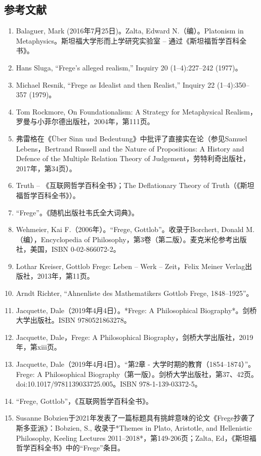 \subsection{参考文献}  
\begin{enumerate}
\item Balaguer, Mark (2016年7月25日)。Zalta, Edward N.（编）。Platonism in Metaphysics。斯坦福大学形而上学研究实验室 – 通过《斯坦福哲学百科全书》。  
\item Hans Sluga, “Frege's alleged realism,” Inquiry 20 (1–4):227–242 (1977)。  
\item Michael Resnik, “Frege as Idealist and then Realist,” Inquiry 22 (1–4):350–357 (1979)。  
\item Tom Rockmore, On Foundationalism: A Strategy for Metaphysical Realism，罗曼与小菲尔德出版社，2004年，第111页。  
\item 弗雷格在《Über Sinn und Bedeutung》中批评了直接实在论（参见Samuel Lebens，Bertrand Russell and the Nature of Propositions: A History and Defence of the Multiple Relation Theory of Judgement，劳特利奇出版社，2017年，第34页）。  
\item Truth – 《互联网哲学百科全书》；The Deflationary Theory of Truth（《斯坦福哲学百科全书》）。  
\item “Frege”。《随机出版社韦氏全大词典》。  
\item Wehmeier, Kai F.（2006年）。“Frege, Gottlob”。收录于Borchert, Donald M.（编），Encyclopedia of Philosophy，第3卷（第二版）。麦克米伦参考出版社，美国，ISBN 0-02-866072-2。  
\item Lothar Kreiser, Gottlob Frege: Leben – Werk – Zeit，Felix Meiner Verlag出版社，2013年，第11页。  
\item Arndt Richter, “Ahnenliste des Mathematikers Gottlob Frege, 1848–1925”。
\item Jacquette, Dale（2019年4月4日）。*Frege: A Philosophical Biography*。剑桥大学出版社。ISBN 9780521863278。  
\item Jacquette, Dale，Frege: A Philosophical Biography，剑桥大学出版社，2019年，第xiii页。  
\item Jacquette, Dale（2019年4月4日）。“第2章 - 大学时期的教育（1854–1874）”。Frege: A Philosophical Biography（第一版）。剑桥大学出版社，第37、42页。doi:10.1017/9781139033725.005。ISBN 978-1-139-03372-5。  
\item “Frege, Gottlob”，《互联网哲学百科全书》。  
\item Susanne Bobzien于2021年发表了一篇标题具有挑衅意味的论文《Frege抄袭了斯多亚派》：Bobzien, S., 收录于*Themes in Plato, Aristotle, and Hellenistic Philosophy, Keeling Lectures 2011–2018*，第149-206页；Zalta, Ed，《斯坦福哲学百科全书》中的“Frege”条目。

\end{enumerate}
